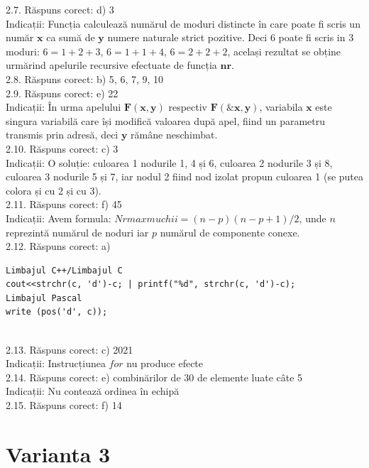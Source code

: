 2.7. Răspuns corect: d) 3\\
Indicații: Funcția calculează numărul de moduri distincte în care poate fi scris un număr $\mathbf{x}$ ca sumă de $\mathbf{y}$ numere naturale strict pozitive. Deci 6 poate fi scris in 3 moduri: $6=1+2+3$, $6=1+1+4$, $6=2+2+2$, același rezultat se obține urmărind apelurile recursive efectuate de funcția $\mathbf{nr}$.\\

2.8. Răspuns corect: b) 5, 6, 7, 9, 10\\

2.9. Răspuns corect: e) 22\\
Indicații: În urma apelului $\mathbf{F}(\mathbf{x}, \mathbf{y})$ respectiv $\mathbf{F}(\mathbf{\& x}, \mathbf{y})$, variabila $\mathbf{x}$ este singura variabilă care își modifică valoarea după apel, fiind un parametru transmis prin adresă, deci $\mathbf{y}$ rămâne neschimbat.\\

2.10. Răspuns corect: c) 3\\
Indicații: O soluție: culoarea 1 nodurile 1, 4 și 6, culoarea 2 nodurile 3 și 8, culoarea 3 nodurile 5 și 7, iar nodul 2 fiind nod izolat propun culoarea 1 (se putea colora și cu 2 și cu 3).\\

2.11. Răspuns corect: f) 45\\
Indicații: Avem formula: $Nrmaxmuchii=(n-p)(n-p+1)/2$, unde $n$ reprezintă numărul de noduri iar $p$ numărul de componente conexe.\\

2.12. Răspuns corect: a)\\
\begin{verbatim}
Limbajul C++/Limbajul C
cout<<strchr(c, 'd')-c; | printf("%d", strchr(c, 'd')-c);
Limbajul Pascal
write (pos('d', c));
\end{verbatim}\\

2.13. Răspuns corect: c) 2021\\
Indicații: Instrucțiunea $for$ nu produce efecte\\

2.14. Răspuns corect: e) combinărilor de 30 de elemente luate câte 5\\
Indicații: Nu contează ordinea în echipă\\

2.15. Răspuns corect: f) 14\\

\section*{Varianta 3}

